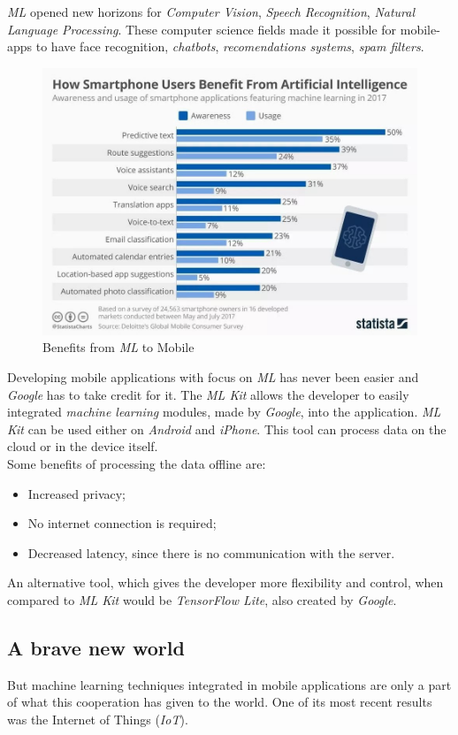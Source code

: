 \documentclass{llncs}
\begin{document}
\emph{ML} opened new horizons for \emph{Computer Vision}, \emph{Speech Recognition}, \emph{Natural Language Processing}. These computer science fields made it possible for mobile-apps to have face recognition, \emph{chatbots}, \emph{recomendations systems}, \emph{spam filters}. 

\begin{figure}
    \centering
    \includegraphics[width=12cm]{mobile_apps.jpg}
    \caption{Benefits from \emph{ML} to Mobile}
    \label{fig:my_label}
\end{figure}

Developing mobile applications with focus on \emph{ML} has never been easier and \emph{Google} has to take credit for it. The \emph{ML Kit} allows the developer to easily integrated \emph{machine learning} modules, made by \emph{Google}, into the application. \emph{ML Kit} can be used either on \emph{Android} and \emph{iPhone}. This tool can process data on the cloud or in the device itself.\\

Some benefits of processing the data offline are:
\begin{itemize}
    \item Increased privacy;
    \item No internet connection is required;
    \item Decreased latency, since there is no communication with the server. 
\end{itemize}

An alternative tool, which gives the developer more flexibility and control, when compared to \emph{ML Kit} would be \emph{TensorFlow Lite}, also created by \emph{Google}.

\subsection{A brave new world}
But machine learning techniques integrated in mobile applications are only a part of what this cooperation has given to the world. One of its most recent results was the Internet of Things (\emph{IoT}).\\
\end{document}
